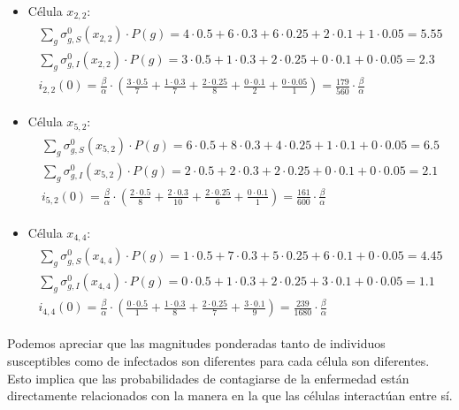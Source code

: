 \begin{example}
\begin{itemize}
    \item Célula $x_{2,2}$:
    \begin{align*}
    \begin{array}{l}
        \sum_g\sigma_{g,S}^0(x_{2,2})\cdot P(g) = 4\cdot0.5+6\cdot0.3+6\cdot0.25+2\cdot0.1+1\cdot0.05 = 5.55 \\
        \sum_g\sigma_{g,I}^0(x_{2,2})\cdot P(g) = 3\cdot0.5+1\cdot0.3+2\cdot0.25+0\cdot0.1+0\cdot0.05 = 2.3\\
        i_{2,2}(0) = \frac{\beta}{\alpha}\cdot\left(\frac{3\cdot0.5}{7}+\frac{1\cdot0.3}{7}+\frac{2\cdot0.25}{8}+\frac{0\cdot0.1}{2}+\frac{0\cdot0.05}{1}\right)=\frac{179}{560}\cdot\frac{\beta}{\alpha}
    \end{array}
    \end{align*}
    \item Célula $x_{5,2}$:
    \begin{align*}
    \begin{array}{l}
        \sum_g\sigma_{g,S}^0(x_{5,2})\cdot P(g) = 6\cdot0.5+8\cdot0.3+4\cdot0.25+1\cdot0.1+0\cdot0.05 = 6.5 \\
        \sum_g\sigma_{g,I}^0(x_{5,2})\cdot P(g) = 2\cdot0.5+2\cdot0.3+2\cdot0.25+0\cdot0.1+0\cdot0.05 = 2.1\\
        i_{5,2}(0) = \frac{\beta}{\alpha}\cdot\left(\frac{2\cdot0.5}{8}+\frac{2\cdot0.3}{10}+\frac{2\cdot0.25}{6}+\frac{0\cdot0.1}{1}\right)=\frac{161}{600}\cdot\frac{\beta}{\alpha}
    \end{array}
    \end{align*}
    \item Célula $x_{4,4}$:
    \begin{align*}
    \begin{array}{l}
        \sum_g\sigma_{g,S}^0(x_{4,4})\cdot P(g) = 1\cdot0.5+7\cdot0.3+5\cdot0.25+6\cdot0.1+0\cdot0.05 = 4.45 \\
        \sum_g\sigma_{g,I}^0(x_{4,4})\cdot P(g) = 0\cdot0.5+1\cdot0.3+2\cdot0.25+3\cdot0.1+0\cdot0.05 = 1.1\\
        i_{4,4}(0) = \frac{\beta}{\alpha}\cdot\left(\frac{0\cdot0.5}{1}+\frac{1\cdot0.3}{8}+\frac{2\cdot0.25}{7}+\frac{3\cdot0.1}{9}\right)=\frac{239}{1680}\cdot\frac{\beta}{\alpha}
    \end{array}
    \end{align*}
\end{itemize}

Podemos apreciar que las magnitudes ponderadas tanto de individuos susceptibles como de infectados son diferentes para cada célula son diferentes. Esto implica que las probabilidades de contagiarse de la enfermedad están directamente relacionados con la manera en la que las células interactúan entre sí.


\end{example}
